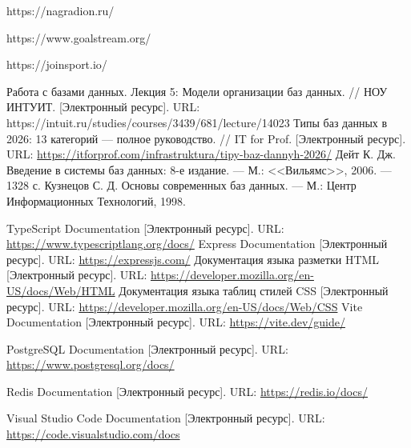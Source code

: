 \begin{thebibliography}{}
	 https://nagradion.ru/
	
	 https://www.goalstream.org/
	
	 https://joinsport.io/
	
	 Работа с базами данных. Лекция 5: Модели организации баз данных. // НОУ ИНТУИТ. [Электронный ресурс]. URL: https://intuit.ru/studies/courses/3439/681/lecture/14023
	 Типы баз данных в 2026: 13 категорий — полное руководство. // IT for Prof. [Электронный ресурс]. URL: \url{https://itforprof.com/infrastruktura/tipy-baz-dannyh-2026/}
	 Дейт К. Дж. Введение в системы баз данных: 8-е издание. --- М.: <<Вильямс>>, 2006. --- 1328 с.
	 Кузнецов С. Д. Основы современных баз данных. --- М.: Центр Информационных Технологий, 1998.
	
	 TypeScript Documentation [Электронный ресурс]. URL: \url{https://www.typescriptlang.org/docs/}
	 Express Documentation [Электронный ресурс]. URL: \url{https://expressjs.com/}
	 Документация языка разметки HTML [Электронный ресурс]. URL: \url{https://developer.mozilla.org/en-US/docs/Web/HTML}
	 Документация языка таблиц стилей CSS [Электронный ресурс]. URL: \url{https://developer.mozilla.org/en-US/docs/Web/CSS}
	 Vite Documentation [Электронный ресурс]. URL: \url{https://vite.dev/guide/}

	
	 PostgreSQL Documentation [Электронный ресурс]. URL: \url{https://www.postgresql.org/docs/}
	
	 Redis Documentation [Электронный ресурс]. URL: \url{https://redis.io/docs/}
	
	 Visual Studio Code Documentation [Электронный ресурс]. URL: \url{https://code.visualstudio.com/docs}
	

\end{thebibliography}
